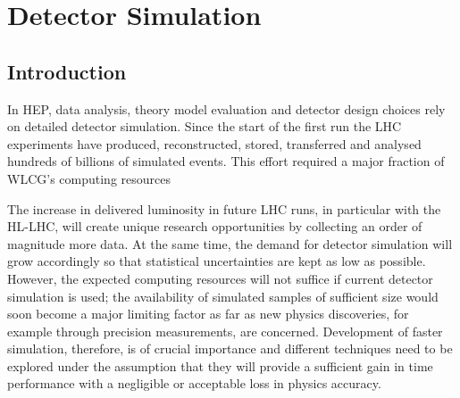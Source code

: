 
\hypertarget{detector-simulation}{%
\section{Detector Simulation}\label{detector-simulation}}

\hypertarget{introduction-2}{%
\subsection{Introduction}\label{introduction-2}}

In HEP, data analysis, theory model evaluation and detector design
choices rely on detailed detector simulation. Since the start of the
first run the LHC experiments have produced, reconstructed, stored,
transferred and analysed hundreds of billions of simulated events. This
effort required a major fraction of WLCG's computing 
resources~\cite{ALICE-TDR-12, ATLAS-TDR-17, CMS-TDR-7, LHCb-TDR-11, WLCG-CM-Update, 
ALICE-TDR-019, LHCb-TDR-018, ATLAS-LHCC-2019-02, CMS-LHCC-2019-09}

The increase in delivered luminosity in future LHC runs, in particular
with the HL-LHC, will create unique research opportunities by collecting
an order of magnitude more data. At the same time, the demand for
detector simulation will grow accordingly so that
statistical uncertainties are kept as low as possible. However, the expected
computing resources will not suffice if current detector simulation is
used; the availability of simulated samples of sufficient size
would soon become a major limiting factor as far as new physics
discoveries, for example through precision measurements, are concerned.
Development of faster simulation, therefore, is of crucial importance
and different techniques need to be explored under the assumption that
they will provide a sufficient gain in time performance with a
negligible or acceptable loss in physics accuracy.

